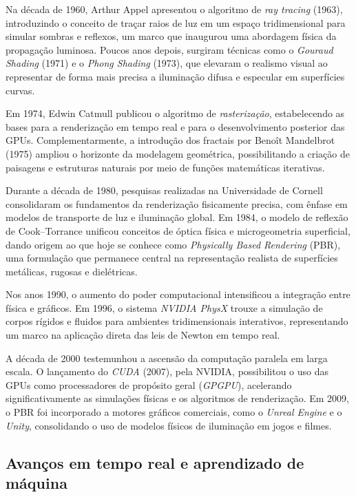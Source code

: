 Na década de 1960, Arthur Appel apresentou o algoritmo de \textit{ray tracing} (1963), introduzindo o conceito de traçar raios de luz em um espaço tridimensional para simular sombras e reflexos, um marco que inaugurou uma abordagem física da propagação luminosa. Poucos anos depois, surgiram técnicas como o \textit{Gouraud Shading} (1971) e o \textit{Phong Shading} (1973), que elevaram o realismo visual ao representar de forma mais precisa a iluminação difusa e especular em superfícies curvas.

Em 1974, Edwin Catmull publicou o algoritmo de \textit{rasterização}, estabelecendo as bases para a renderização em tempo real e para o desenvolvimento posterior das GPUs. Complementarmente, a introdução dos fractais por Benoît Mandelbrot (1975) ampliou o horizonte da modelagem geométrica, possibilitando a criação de paisagens e estruturas naturais por meio de funções matemáticas iterativas.

Durante a década de 1980, pesquisas realizadas na Universidade de Cornell consolidaram os fundamentos da renderização fisicamente precisa, com ênfase em modelos de transporte de luz e iluminação global. Em 1984, o modelo de reflexão de Cook–Torrance unificou conceitos de óptica física e microgeometria superficial, dando origem ao que hoje se conhece como \textit{Physically Based Rendering} (PBR), uma formulação que permanece central na representação realista de superfícies metálicas, rugosas e dielétricas.

Nos anos 1990, o aumento do poder computacional intensificou a integração entre física e gráficos. Em 1996, o sistema \textit{NVIDIA PhysX} trouxe a simulação de corpos rígidos e fluidos para ambientes tridimensionais interativos, representando um marco na aplicação direta das leis de Newton em tempo real.

A década de 2000 testemunhou a ascensão da computação paralela em larga escala. O lançamento do \textit{CUDA} (2007), pela NVIDIA, possibilitou o uso das GPUs como processadores de propósito geral (\textit{GPGPU}), acelerando significativamente as simulações físicas e os algoritmos de renderização. Em 2009, o PBR foi incorporado a motores gráficos comerciais, como o \textit{Unreal Engine} e o \textit{Unity}, consolidando o uso de modelos físicos de iluminação em jogos e filmes.

\subsection{Avanços em tempo real e aprendizado de máquina}

